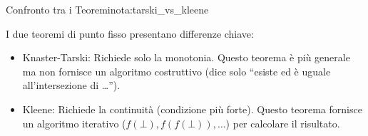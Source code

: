 \begin{nota}{Confronto tra i Teoremi}{nota:tarski_vs_kleene}

I due teoremi di punto fisso presentano differenze chiave:
\begin{itemize}
    \item Knaster-Tarski: Richiede solo la monotonia. Questo teorema è più
    generale ma non fornisce un algoritmo costruttivo (dice solo ``esiste ed
    è uguale all'intersezione di \ldots'').
    \item Kleene: Richiede la continuità (condizione più forte). Questo
    teorema fornisce un algoritmo iterativo ($f(\bot), f(f(\bot)), \dots$)
    per calcolare il risultato.
\end{itemize}

\end{nota}